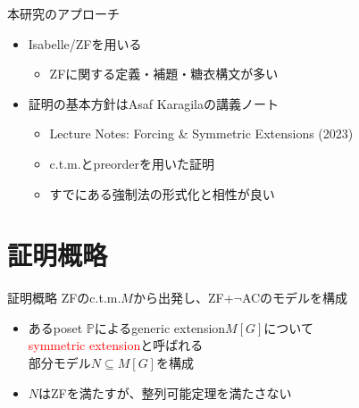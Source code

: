 \documentclass[17pt,aspectratio=169]{beamer}
\begin{document}
\begin{frame}{本研究のアプローチ}
    \vspace{10pt}

    \begin{itemize}
        \item Isabelle/ZFを用いる
              {\small \begin{itemize}
                  \item ZFに関する定義・補題・糖衣構文が多い


              \end{itemize}}
        \item 証明の基本方針はAsaf Karagilaの講義ノート
              {\small \begin{itemize}
                  \item Lecture Notes: Forcing \& Symmetric Extensions (2023)
                  \item c.t.m.とpreorderを用いた証明
                  \item すでにある強制法の形式化と相性が良い
              \end{itemize} }

    \end{itemize}
\end{frame}

\section{証明概略}
\begin{frame}{証明概略}
    ZFのc.t.m.$M$から出発し、ZF+$\neg$ACのモデルを構成
    \begin{itemize}
        \item あるposet $\mathbb{P}$によるgeneric extension$M[G]$について\\
              \textcolor{red}{symmetric extension}と呼ばれる\\
              部分モデル$N \subseteq M[G]$を構成
        \item $N$はZFを満たすが、整列可能定理を満たさない
    \end{itemize}
\end{frame}
\end{document}
